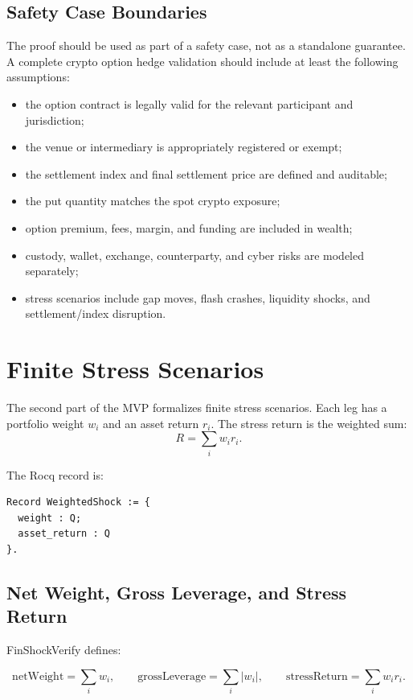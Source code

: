 \documentclass[11pt]{article}
\begin{document}
\subsection{Safety Case Boundaries}

The proof should be used as part of a safety case, not as a standalone
guarantee. A complete crypto option hedge validation should include at least
the following assumptions:

\begin{itemize}
  \item the option contract is legally valid for the relevant participant and
  jurisdiction;
  \item the venue or intermediary is appropriately registered or exempt;
  \item the settlement index and final settlement price are defined and
  auditable;
  \item the put quantity matches the spot crypto exposure;
  \item option premium, fees, margin, and funding are included in wealth;
  \item custody, wallet, exchange, counterparty, and cyber risks are modeled
  separately;
  \item stress scenarios include gap moves, flash crashes, liquidity shocks,
  and settlement/index disruption.
\end{itemize}

\section{Finite Stress Scenarios}

The second part of the MVP formalizes finite stress scenarios. Each leg has a
portfolio weight \(w_i\) and an asset return \(r_i\). The stress return is the
weighted sum:
\[
  R = \sum_i w_i r_i.
\]

The Rocq record is:

\begin{lstlisting}[language=Coq]
Record WeightedShock := {
  weight : Q;
  asset_return : Q
}.
\end{lstlisting}

\subsection{Net Weight, Gross Leverage, and Stress Return}

FinShockVerify defines:

\[
  \mathrm{netWeight} = \sum_i w_i,
  \qquad
  \mathrm{grossLeverage} = \sum_i |w_i|,
  \qquad
  \mathrm{stressReturn} = \sum_i w_i r_i.
\]
\end{document}
